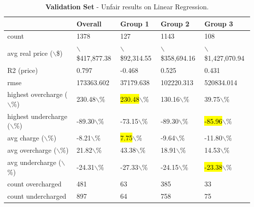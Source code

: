 \documentclass{article}
\begin{document}
\begin{table}[!ht]
    \centering
    \begin{tabular}{|l|l|l|l|l|}
    \hline
        ~ & Overall & Group 1 & Group 2 & Group 3 \\ \hline
        count & 1378 & 127 & 1143 & 108 \\ \hline
        avg real price ($\backslash$\$) & $\backslash$\$417,877.38 & $\backslash$\$92,314.55 & $\backslash$\$358,694.16 & $\backslash$\$1,427,070.94 \\ \hline
        R2 (price) & 0.797 & -0.468 & 0.525 & 0.431 \\ \hline
        rmse & 173363.602 & 37179.638 & 102220.313 & 520834.014 \\ \hline
        highest overcharge ($\backslash$\%) & 230.48$\backslash$\% & \hl{230.48}$\backslash$\% & 130.16$\backslash$\% & 39.75$\backslash$\% \\ \hline
        highest undercharge ($\backslash$\%) & -89.30$\backslash$\% & -73.15$\backslash$\% & -89.30$\backslash$\% & \hl{-85.96}$\backslash$\% \\ \hline
        avg charge ($\backslash$\%) & -8.21$\backslash$\% & \hl{7.75}$\backslash$\% & -9.64$\backslash$\% & -11.80$\backslash$\% \\ \hline
        avg overcharge ($\backslash$\%) & 21.82$\backslash$\% & {43.38}$\backslash$\% & {18.91}$\backslash$\% & 14.53$\backslash$\% \\ \hline
        avg undercharge ($\backslash$\%) & -24.31$\backslash$\% & -27.33$\backslash$\% & -24.15$\backslash$\% & \hl{-23.38}$\backslash$\% \\ \hline
        count overcharged & 481 & 63 & 385 & 33 \\ \hline
        count undercharged & 897 & 64 & 758 & 75 \\ \hline
    \end{tabular}
    \caption{\textbf{Validation Set} - Unfair results on Linear Regression.}
    \label{tab2:val_summary}
\end{table}
\end{document}
